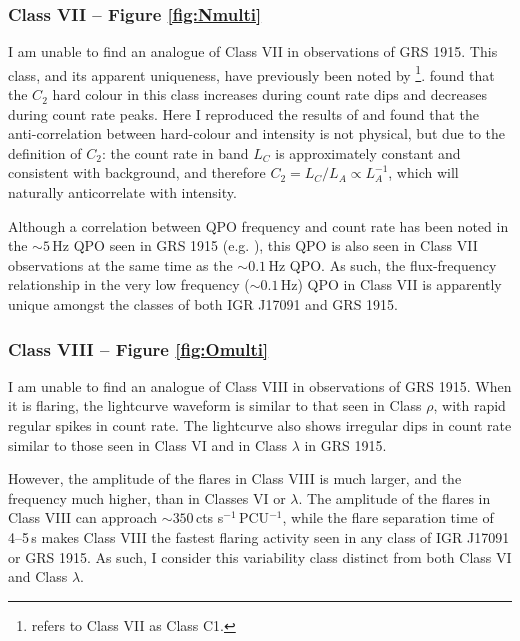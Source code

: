 \subsubsection{Class VII -- Figure \ref{fig:Nmulti}}

\par I am unable to find an analogue of Class VII in observations of GRS 1915.  This class, and its apparent uniqueness, have previously been noted by \citealp{Pahari_IGRClasses}\footnote{\citet{Pahari_IGRClasses} refers to Class VII as Class C1.}.  \citeauthor{Pahari_IGRClasses} found  that the $C_2$ hard colour in this class increases during count rate dips and decreases during count rate peaks.  Here I reproduced the results of \citeauthor{Pahari_IGRClasses} and found that the anti-correlation between hard-colour and intensity is not physical, but due to the definition of $C_2$: the count rate in band $L_C$ is approximately constant and consistent with background, and therefore $C_2=L_C/L_A \propto L_A^{-1}$, which will naturally anticorrelate with intensity.
\par Although a correlation between QPO frequency and count rate has been noted in the $\sim5$\,Hz QPO seen in GRS 1915 (e.g. \citealp{Markwardt_FluxFreqGRS,Vignarca_FluxFreqGRS}), this QPO is also seen in Class VII observations at the same time as the $\sim0.1$\,Hz QPO.  As such, the flux-frequency relationship in the very low frequency ($\sim0.1$\,Hz) QPO in Class VII is apparently unique amongst the classes of both IGR J17091 and GRS 1915.

\subsubsection{Class VIII -- Figure \ref{fig:Omulti}}

\par I am unable to find an analogue of Class VIII in observations of GRS 1915.  When it is flaring, the lightcurve waveform is similar to that seen in Class $\rho$, with rapid regular spikes in count rate.  The lightcurve also shows irregular dips in count rate similar to those seen in Class VI and in Class $\lambda$ in GRS 1915.
\par However, the amplitude of the flares in Class VIII is much larger, and the frequency much higher, than in Classes VI or $\lambda$.  The amplitude of the flares in Class VIII can approach $\sim350$\,cts s$^{-1}$\,PCU$^{-1}$, while the flare separation time of 4--5\,s makes Class VIII the fastest flaring activity seen in any class of IGR J17091 or GRS 1915.  As such, I consider this variability class distinct from both Class VI and Class $\lambda$. 

